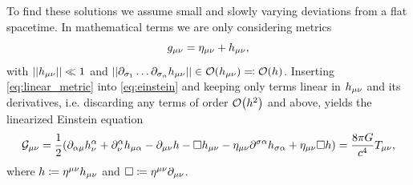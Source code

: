 To find these solutions we assume small and slowly varying deviations from a flat spacetime. In mathematical terms we are only considering metrics
\begin{equation}\label{eq:linear_metric}
g_{\mu\nu} = \eta_{\mu\nu} + h_{\mu\nu},
\end{equation}
with $\left|\left|h_{\mu\nu}\right|\right|\ll 1$ and $\left|\left|\partial_{\sigma_1}\dots\partial_{\sigma_n}h_{\mu\nu}\right|\right|\in\mathcal{O}{\left( h_{\mu\nu} \right)}\eqqcolon\mathcal{O}{\left( h \right)}$. Inserting \eqref{eq:linear_metric} into \eqref{eq:einstein} and keeping only terms linear in $h_{\mu\nu}$ and its derivatives, i.e. discarding any terms of order $\mathcal{O}{\left( h^2 \right)}$ and above, yields the linearized Einstein equation
\begin{equation}\label{eq:einstein_linear}
\mathcal{G}_{\mu\nu} = \frac{1}{2} {\left( \partial_{\alpha\mu}h^\alpha_\nu + \partial^\alpha_\nu h_{\mu\alpha} - \partial_{\mu\nu} h - \Box h_{\mu\nu} - \eta_{\mu\nu} \partial^{\sigma\alpha}h_{\sigma\alpha} + \eta_{\mu\nu}\Box h \right)} = \frac{8\pi G}{c^4}T_{\mu\nu},
\end{equation}
where $h\coloneqq \eta^{\mu\nu} h_{\mu\nu}$ and $\Box\coloneqq \eta^{\mu\nu}\partial_{\mu\nu}$.

